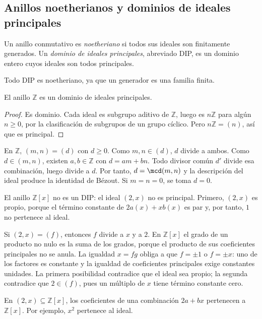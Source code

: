 \subsection{Anillos noetherianos y dominios de ideales principales}
\begin{defi}
Un anillo conmutativo es \emph{noetheriano} si todos sus ideales son finitamente generados. Un \emph{dominio de ideales principales}, abreviado DIP, es un dominio entero cuyos ideales son todos principales.
\end{defi}
Todo DIP es noetheriano, ya que un generador es una familia finita.

\begin{prop}\label{prop:C12-ZDIP}
El anillo $\mathbb Z$ es un dominio de ideales principales.
\end{prop}
\begin{proof}
Es dominio. Cada ideal es subgrupo aditivo de $\mathbb Z$, luego es $n\mathbb Z$ para algún $n\geq0$, por la clasificación de subgrupos de un grupo cíclico. Pero $n\mathbb Z=(n)$, así que es principal.
\end{proof}

\begin{ejem}
En $\mathbb Z$, $(m,n)=(d)$ con $d\geq0$. Como $m,n\in(d)$, $d$ divide a ambos. Como $d\in(m,n)$, existen $a,b\in\mathbb Z$ con $d=am+bn$. Todo divisor común $d'$ divide esa combinación, luego divide a $d$. Por tanto, $d=\mcd(m,n)$ y la descripción del ideal produce la identidad de Bézout. Si $m=n=0$, se toma $d=0$.
\end{ejem}

\begin{ejem}\label{ejem:C12-noDIP}
El anillo $\mathbb Z[x]$ no es un DIP: el ideal $(2,x)$ no es principal. Primero, $(2,x)$ es propio, porque el término constante de $2a(x)+xb(x)$ es par y, por tanto, $1$ no pertenece al ideal.

Si $(2,x)=(f)$, entonces $f$ divide a $x$ y a $2$. En $\mathbb Z[x]$ el grado de un producto no nulo es la suma de los grados, porque el producto de sus coeficientes principales no se anula. La igualdad $x=fg$ obliga a que $f=\pm1$ o $f=\pm x$: uno de los factores es constante y la igualdad de coeficientes principales exige constantes unidades. La primera posibilidad contradice que el ideal sea propio; la segunda contradice que $2\in(f)$, pues un múltiplo de $x$ tiene término constante cero.
\end{ejem}
\begin{obs}
En $(2,x)\subseteq\mathbb Z[x]$, los coeficientes de una combinación $2a+bx$ pertenecen a $\mathbb Z[x]$. Por ejemplo, $x^2$ pertenece al ideal.
\end{obs}

